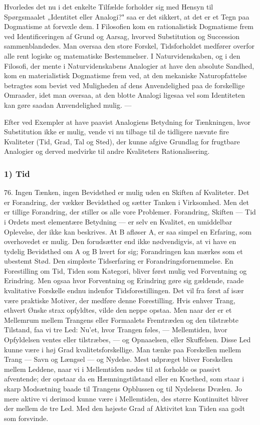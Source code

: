 \documentclass[12pt,a4paper]{book}
\newcommand{\apage}[1]{\marginnote{\footnotesize\textit{[#1]}}}
\begin{document}
\apage{186} Hvorledes det nu i det enkelte Tilfælde forholder sig med Hensyn til
Spørgsmaalet „Identitet eller Analogi?" saa er det sikkert, at det er et
Tegn paa Dogmatisme at forvexle dem. I Filosofien kom en rationalistisk
Dogmatisme frem ved Identificeringen af Grund og Aarsag, hvorved
Substitution og Succession sammenblandedes. Man oversaa den store
Forskel, Tidsforholdet medfører overfor alle rent logiske og
matematiske Bestemmelser. I Naturvidenskaben, og i den Filosofi, der
mente i Naturvidenskabens Analogier at have den absolute Sandhed, kom en
materialistisk Dogmatisme frem ved, at den mekaniske Naturopfattelse
betragtes som bevist ved Muligheden af dens Anvendelighed paa de
forskellige Omraader, idet man oversaa, at den blotte Analogi ligesaa
vel som Identiteten kan gøre saadan Anvendelighed mulig. ---

Efter ved Exempler at have paavist Analogiens Betydning for Tænkningen,
hvor Substitution ikke er mulig, vende vi nu tilbage til de tidligere
nævnte fire Kvaliteter (Tid, Grad, Tal og Sted), der kunne afgive
Grundlag for frugtbare Analogier og derved medvirke til andre
Kvaliteters Rationalisering.

\subsubsection*{1) Tid}

76. Ingen Tænken, ingen Bevidsthed er mulig uden en Skiften af
Kvaliteter. Det er Forandring, der vækker Bevidsthed og sætter
Tanken i Virksomhed. Men det er tillige Forandring, der stiller os alle
vore Problemer. Forandring, Skiften --- Tid i Ordets mest elementære
Betydning --- er selv en Kvalitet, en umiddelbar Oplevelse, der ikke kan
beskrives. At B afløser A, er saa simpel en Erfaring, som overhovedet er
mulig. Den forudsætter end ikke nødvendigvis, at vi have en tydelig
Bevidsthed om A og B hvert for sig; Forandringen kan mærkes som et
ubestemt Stød. Den simpleste Tidserfaring er Forandringsfornemmelse. En
Forestilling om Tid, Tiden som Kategori, bliver først mulig ved
Forventning og Erindring. Men ogsaa hvor Forventning og Erindring gøre
sig gældende, raade kvalitative Forskelle endnu \apage{187} indenfor
Tidsforestillingen. Det vil fra først af især være praktiske Motiver,
der medføre denne Forestilling. Hvis enhver Trang, ethvert Ønske strax
opfyldtes, vilde den neppe opstaa. Men naar der er et Mellemrum mellem
Trangens eller Formaalets Fremtræden og den tilstræbte Tilstand, faa vi
tre Led: Nu'et, hvor Trangen føles, --- Mellemtiden, hvor Opfyldelsen
ventes eller tilstræbes, --- og Opnaaelsen, eller Skuffelsen. Disse Led
kunne være i høj Grad kvalitetsforskellige. Man tænke paa Forskellen
mellem Trang --- Savn og Længsel --- og Nydelse. Mest udpræget bliver
Forskellen mellem Leddene, naar vi i Mellemtiden nødes til at forholde
os passivt afventende; der opstaar da en Hæmningstilstand eller en
Kuethed, som staar i skarp Modsætning baade til Trangens Opblussen og
til Nydelsens Dvælen. Jo mere aktive vi derimod kunne være i
Mellemtiden, des større Kontinuitet bliver der mellem de tre Led. Med
den højeste Grad af Aktivitet kan Tiden saa godt som forsvinde.
\end{document}
